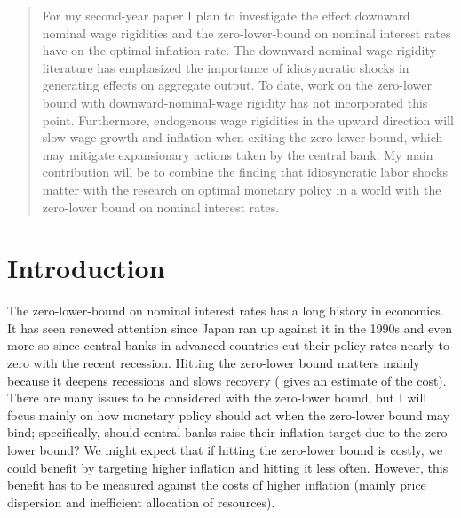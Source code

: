 \documentclass[12pt,a4paper]{article}            %
\begin{document}



\begin{abstract}
For my second-year paper I plan to investigate the effect downward nominal wage rigidities and the zero-lower-bound on nominal interest rates have on the optimal inflation rate.
The downward-nominal-wage rigidity literature has emphasized the importance of idiosyncratic shocks in generating effects on aggregate output.
To date, work on the zero-lower bound with downward-nominal-wage rigidity has not incorporated this point.
Furthermore, endogenous wage rigidities in the upward direction will slow wage growth and inflation when exiting the zero-lower bound, which may mitigate expansionary actions taken by the central bank.
My main contribution will be to combine the finding that idiosyncratic labor shocks matter with the research on optimal monetary policy in a world with the zero-lower bound on nominal interest rates.
\end{abstract}
\newpage
\section{Introduction}
\label{sec:introduction}

The zero-lower-bound on nominal interest rates has a long history in economics. It has seen renewed attention since Japan ran up against it in the 1990s and even more so since central banks in advanced countries cut their policy rates nearly to zero with the recent recession.
Hitting the zero-lower bound matters mainly because it deepens recessions and slows recovery (\cite{williams_2009} gives an estimate of the cost).
There are many issues to be considered with the zero-lower bound, but I will focus mainly on how monetary policy should act when the zero-lower bound may bind;
specifically, should central banks raise their inflation target due to the zero-lower bound?
We might expect that if hitting the zero-lower bound is costly, we could benefit by targeting higher inflation and hitting it less often.
However, this benefit has to be measured against the costs of higher inflation (mainly price dispersion and inefficient allocation of resources).
\end{document}
